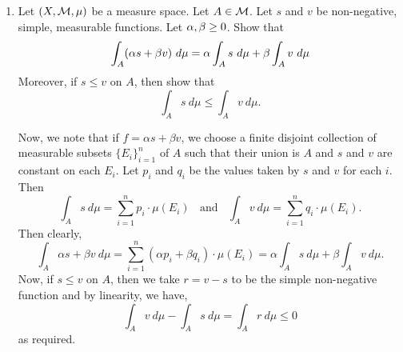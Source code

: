 \documentclass[12pt]{article}
\begin{document}
\begin{enumerate}
\item Let $(X, \mathcal{M}, \mu)$ be a measure space. Let $A \in \mathcal{M}$.
Let $s$ and $v$ be non-negative, simple, measurable functions.
Let $\alpha, \beta \geq 0$. Show that 
$$\int_A (\alpha s + \beta v ) \ d\mu = \alpha  \int_A s \ d\mu + \beta \int_A v  \ d\mu$$
Moreover, if $s \leq v$ on $A$, then show that 
$$ \int_A s \ d\mu \leq \int_A v \ d\mu.$$

\begin{mybox}
  Now, we note that if $f=\alpha s+\beta v$,
  we choose a finite disjoint collection of measurable
  subsets $\{E_i\}_{i=1}^n$ of $A$ such that their union
  is $A$ and $s$ and $v$ are constant on each
  $E_i$. Let $p_i$ and $q_i$ be the values taken by $s$
  and $v$ for each $i$. Then
  $$\int_A{s\ d\mu}=\sum_{i=1}^n{p_i\cdot\mu(E_i)}
  \ \ \ \ \text{and}\ \ \ \
  \int_A{v\ d\mu}=\sum_{i=1}^n{q_i\cdot\mu(E_i)}.$$
  Then clearly,
  $$\int_A{\alpha s+\beta v\ d\mu}=
  \sum_{i=1}^n{(\alpha p_i+\beta q_i)\cdot\mu(E_i)}
  =\alpha\int_A{s\ d\mu} +\beta \int_A{v\ d\mu}.$$
  Now, if $s\leq v$ on $A$, then we take $r=v-s$ to be the
  simple non-negative function and by linearity, we have,
  $$\int_A{v\ d\mu}-\int_A{s\ d\mu}
  =\int_A{r\ d\mu}\leq 0$$
  as required.
\end{mybox}

\end{enumerate}
\end{document}
